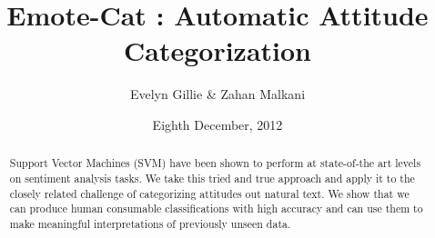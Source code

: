 \documentclass[11pt]{article}
\title{Emote-Cat : Automatic Attitude Categorization}
\author{Evelyn Gillie \& Zahan Malkani}
\date{Eighth December, 2012}
\begin{document}
\maketitle

\begin{abstract}
Support Vector Machines (SVM) have been shown to perform at state-of-the art levels on sentiment analysis tasks. We take this tried and true approach and apply it to the closely related challenge of categorizing attitudes out natural text. We show that we can produce human consumable classifications with high accuracy and can use them to make meaningful interpretations of previously unseen data.
\end{abstract}
\end{document}
